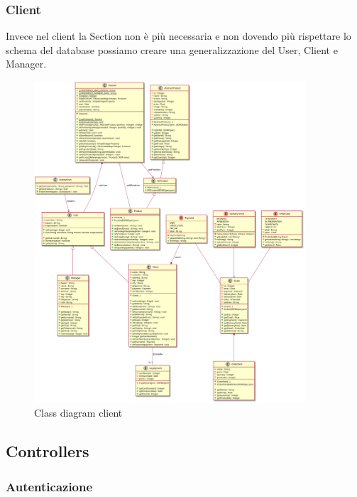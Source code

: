 \documentclass[12pt, a4paper]{report}
\begin{document}
\newpage

\subsubsection{Client}

Invece nel client la Section non è più necessaria e non dovendo più rispettare
lo schema del database possiamo creare una generalizzazione del User, Client e
Manager.

\begin{figure}[h]
  \centering
  \includegraphics[width=0.9\textwidth]{client_models_class.png}
  \caption{Class diagram client}
\end{figure}

\newpage


\subsection{Controllers}

\subsubsection{Autenticazione}
\end{document}
